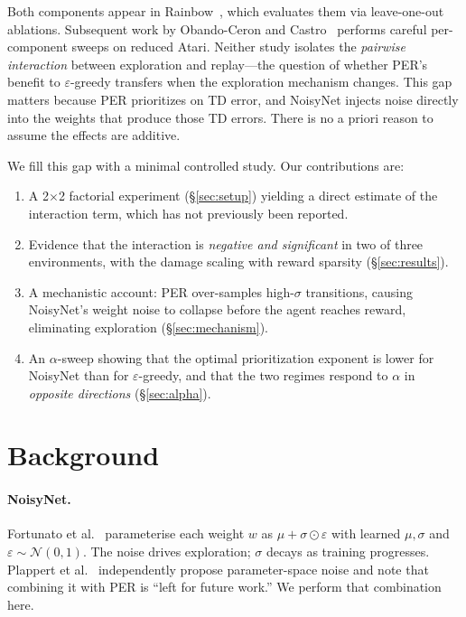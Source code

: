 \documentclass{article}
\begin{document}
Both components appear in Rainbow~\cite{hessel2018rainbow}, which evaluates
them via leave-one-out ablations.
Subsequent work by Obando-Ceron and Castro~\cite{obando2021revisiting}
performs careful per-component sweeps on reduced Atari.
Neither study isolates the \emph{pairwise interaction} between exploration and
replay---the question of whether PER's benefit to $\varepsilon$-greedy
transfers when the exploration mechanism changes.
This gap matters because PER prioritizes on TD error, and NoisyNet injects
noise directly into the weights that produce those TD errors.
There is no a priori reason to assume the effects are additive.

We fill this gap with a minimal controlled study.
Our contributions are:
\begin{enumerate}
  \item A 2$\times$2 factorial experiment (\S\ref{sec:setup}) yielding a
        direct estimate of the interaction term, which has not previously been
        reported.
  \item Evidence that the interaction is \emph{negative and significant} in
        two of three environments, with the damage scaling with reward sparsity
        (\S\ref{sec:results}).
  \item A mechanistic account: PER over-samples high-$\sigma$ transitions,
        causing NoisyNet's weight noise to collapse before the agent reaches
        reward, eliminating exploration (\S\ref{sec:mechanism}).
  \item An $\alpha$-sweep showing that the optimal prioritization exponent
        is lower for NoisyNet than for $\varepsilon$-greedy, and that the
        two regimes respond to $\alpha$ in \emph{opposite directions}
        (\S\ref{sec:alpha}).
\end{enumerate}

\section{Background}
\label{sec:background}

\paragraph{NoisyNet.}
Fortunato et al.~\cite{fortunato2017noisy} parameterise each weight $w$ as
$\mu + \sigma \odot \varepsilon$ with learned $\mu,\sigma$ and
$\varepsilon \sim \mathcal{N}(0,1)$.
The noise drives exploration; $\sigma$ decays as training progresses.
Plappert et al.~\cite{plappert2018parameter} independently propose
parameter-space noise and note that combining it with PER is ``left for future
work.'' We perform that combination here.
\end{document}
